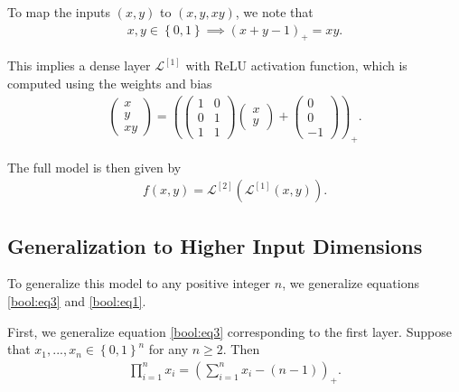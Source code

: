 \documentclass{somasmsc}
\begin{document}
To map the inputs $\left(x, y\right)$ to $\left(x, y, xy\right)$, we note that
\begin{align} \label{bool:eq3}
x, y \in \left\{0, 1\right\} \implies \left(x + y - 1\right)_+ = xy.
\end{align}

This implies a dense layer $\mathcal{L}^{\left[1\right]}$ with ReLU activation function, which is computed using the weights and bias
\begin{align} \label{bool:eq4}
\begin{pmatrix}
    x \\
    y \\
    xy
\end{pmatrix}
=
\left(
\begin{pmatrix}
    1 & 0 \\
    0 & 1 \\
    1 & 1
\end{pmatrix}
\begin{pmatrix}
    x \\
    y
\end{pmatrix}
+
\begin{pmatrix}
    0 \\
    0 \\
    -1
\end{pmatrix}
\right)_+.
\end{align}

\newpage

The full model is then given by
\begin{align*}
f(x, y) = \mathcal{L}^{\left[2\right]}\left(\mathcal{L}^{\left[1\right]}\left(x, y\right)\right).
\end{align*}

\subsection{Generalization to Higher Input Dimensions}\label{bool:gen}

To generalize this model to any positive integer $n$, we generalize equations \ref{bool:eq3} and \ref{bool:eq1}.

First, we generalize equation \ref{bool:eq3} corresponding to the first layer. Suppose that $x_1, ..., x_n \in \left\{0, 1\right\}^n$ for any $n \geq 2$. Then
\begin{align}\label{bool:eq5}
\prod_{i=1}^{n} x_i = \left(\sum_{i=1}^{n} x_i - \left(n - 1\right)\right)_+.
\end{align}
\end{document}

